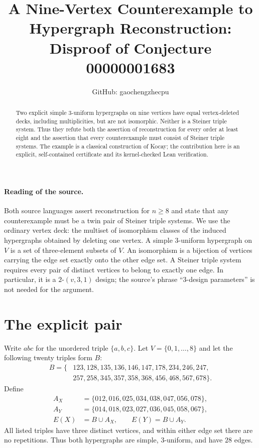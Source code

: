 \documentclass[11pt]{article}
\title{A Nine-Vertex Counterexample to Hypergraph Reconstruction:\\Disproof of Conjecture 00000001683}
\author{GitHub: gaochengzhecpu}
\date{}
\begin{document}
\maketitle
\begin{abstract}
Two explicit simple $3$-uniform hypergraphs on nine vertices have equal
vertex-deleted decks, including multiplicities, but are not isomorphic.
Neither is a Steiner triple system. Thus they refute both the assertion
of reconstruction for every order at least eight and the assertion that
every counterexample must consist of Steiner triple systems. The example
is a classical construction of Kocay; the contribution here is an explicit,
self-contained certificate and its kernel-checked Lean verification.
\end{abstract}

\paragraph{Reading of the source.}
Both source languages assert reconstruction for $n\geq8$ and state that
any counterexample must be a twin pair of Steiner triple systems. We use
the ordinary vertex deck: the multiset of isomorphism classes of the
induced hypergraphs obtained by deleting one vertex. A simple
$3$-uniform hypergraph on $V$ is a set of three-element subsets of $V$.
An isomorphism is a bijection of vertices carrying the edge set exactly
onto the other edge set. A Steiner triple system requires every pair of
distinct vertices to belong to exactly one edge. In particular, it is a
$2$-$(v,3,1)$ design; the source's phrase ``3-design parameters'' is not
needed for the argument.

\section*{The explicit pair}
Write $abc$ for the unordered triple $\{a,b,c\}$. Let
$V=\{0,1,\ldots,8\}$ and let the following twenty triples form $B$:
\[
\begin{aligned}
B=\{&123,128,135,136,146,147,178,234,246,247,\\
    &257,258,345,357,358,368,456,468,567,678\}.
\end{aligned}
\]
Define
\[
\begin{aligned}
A_X&=\{012,016,025,034,038,047,056,078\},\\
A_Y&=\{014,018,023,027,036,045,058,067\},\\
E(X)&=B\cup A_X,\qquad E(Y)=B\cup A_Y.
\end{aligned}
\]
All listed triples have three distinct vertices, and within either edge
set there are no repetitions. Thus both hypergraphs are simple,
$3$-uniform, and have $28$ edges.
\end{document}
